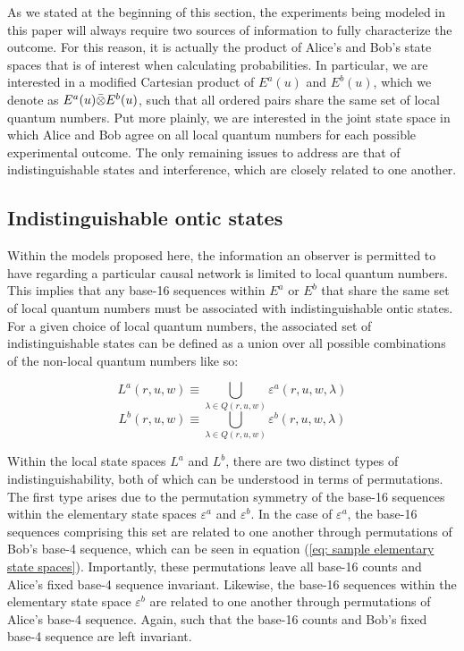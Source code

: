 \documentclass{article}
\begin{document}
As we stated at the beginning of this section, the experiments being modeled in this paper will always require two sources of information to fully characterize the outcome. For this reason, it is actually the product of Alice's and Bob's state spaces that is of interest when calculating probabilities. In particular, we are interested in a modified Cartesian product of $E^{a}(u)$ and $E^{b}(u)$, which we denote as $E^{a}(u)\Bar{\otimes}E^{b}(u)$, such that all ordered pairs share the same set of local quantum numbers. Put more plainly, we are interested in the joint state space in which Alice and Bob agree on all local quantum numbers for each possible experimental outcome. The only remaining issues to address are that of indistinguishable states and interference, which are closely related to one another. 

\subsection{Indistinguishable ontic states \label{sec: Indistinguishable states}}

Within the models proposed here, the information an observer is permitted to have regarding a particular causal network is limited to local quantum numbers. This implies that any base-16 sequences within $E^a$ or $E^b$ that share the same set of local quantum numbers must be associated with indistinguishable ontic states. For a given choice of local quantum numbers, the associated set of indistinguishable states can be defined as a union over all possible combinations of the non-local quantum numbers like so:

\begin{equation}
    L^a(r,u,w)\equiv\bigcup_{\lambda \in Q(r, u, w)}\varepsilon^{a}(r,u,w,\lambda)
    \label{eq: local state space Alice}
\end{equation}
\begin{equation}
    L^b(r,u,w)\equiv\bigcup_{\lambda \in Q(r, u, w)}\varepsilon^{b}(r,u,w,\lambda)
    \label{eq: local state space Bob}
\end{equation}

Within the local state spaces $L^a$ and $L^b$, there are two distinct types of indistinguishability, both of which can be understood in terms of permutations. The first type arises due to the permutation symmetry of the base-16 sequences within the elementary state spaces $\varepsilon^a$ and $\varepsilon^b$. In the case of $\varepsilon^a$, the base-16 sequences comprising this set are related to one another through permutations of Bob's base-4 sequence, which can be seen in equation (\ref{eq: sample elementary state spaces}). Importantly, these permutations leave all base-16 counts and Alice's fixed base-4 sequence invariant. Likewise, the base-16 sequences within the elementary state space $\varepsilon^b$ are related to one another through permutations of Alice's base-4 sequence. Again, such that the base-16 counts and Bob's fixed base-4 sequence are left invariant. 
\end{document}
